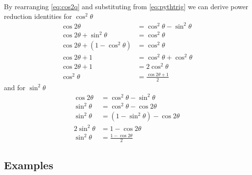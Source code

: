 By rearranging \eqref{eq:cos2q} and substituting from \eqref{eq:pythtrig} we can derive power reduction identities for $\cos^2 \theta$
\begin{align}
  \cos{2\theta} &= \cos^2 \theta - \sin^2\theta \nonumber \\
  \cos{2\theta} + \sin^2\theta &= \cos^2\theta \nonumber \\
  \cos{2\theta} + (1-\cos^2 \theta) &=\cos^2\theta \nonumber \\
  \cos{2\theta} + 1 &= \cos^2\theta + \cos^2\theta \nonumber \\
  \cos{2\theta}+1 &= 2 \cos^2\theta \nonumber \\
  \cos^2\theta &= \frac{\cos{2\theta}+1}{2}
  \label{eq:cossqq}
\end{align}
and for $\sin^2 \theta$
\begin{align}
  \cos{2\theta} &= \cos^2 \theta - \sin^2\theta \nonumber \\
  \sin^2 \theta &= \cos^2 \theta - \cos{2 \theta} \nonumber \\
  \sin^2 \theta &= (1-\sin^2 \theta) - \cos{2 \theta} \nonumber \\
  2 \sin^2 \theta &= 1-\cos{2\theta} \nonumber \\
  \sin^2 \theta &= \frac{1-\cos{2\theta}}{2}
  \label{eq:sinsqq}
\end{align}


\subsection{Examples}

